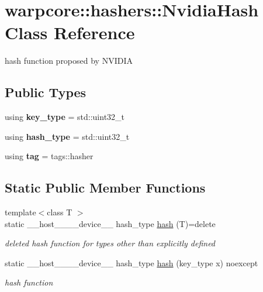 \hypertarget{classwarpcore_1_1hashers_1_1NvidiaHash}{}\section{warpcore\+:\+:hashers\+:\+:Nvidia\+Hash Class Reference}
\label{classwarpcore_1_1hashers_1_1NvidiaHash}


hash function proposed by N\+V\+I\+D\+IA  


\subsection*{Public Types}
\begin{DoxyCompactItemize}
\item 
\mbox{\label{classwarpcore_1_1hashers_1_1NvidiaHash_a3a9a637b8f756fc4a83139e91a13c78d}} 
using {\bfseries key\+\_\+type} = std\+::uint32\+\_\+t
\item 
\mbox{\label{classwarpcore_1_1hashers_1_1NvidiaHash_a0b44b557219bbe3ae15f942ed845eac5}} 
using {\bfseries hash\+\_\+type} = std\+::uint32\+\_\+t
\item 
\mbox{\label{classwarpcore_1_1hashers_1_1NvidiaHash_acdb2058590d95e81eb536dc5a4c154bd}} 
using {\bfseries tag} = tags\+::hasher
\end{DoxyCompactItemize}
\subsection*{Static Public Member Functions}
\begin{DoxyCompactItemize}
\item 
{\footnotesize template$<$class T $>$ }\\static \+\_\+\+\_\+host\+\_\+\+\_\+\+\_\+\+\_\+device\+\_\+\+\_\+ hash\+\_\+type \hyperlink{classwarpcore_1_1hashers_1_1NvidiaHash_acb6c24c9eaba45db786a261978f8f2ba}{hash} (T)=delete
\begin{DoxyCompactList}\small\item\em deleted hash function for types other than explicitly defined \end{DoxyCompactList}\item 
static \+\_\+\+\_\+host\+\_\+\+\_\+\+\_\+\+\_\+device\+\_\+\+\_\+ hash\+\_\+type \hyperlink{classwarpcore_1_1hashers_1_1NvidiaHash_ad86796fdcf66b02789ec16f6d0936f3a}{hash} (key\+\_\+type x) noexcept
\begin{DoxyCompactList}\small\item\em hash function \end{DoxyCompactList}\end{DoxyCompactItemize}


